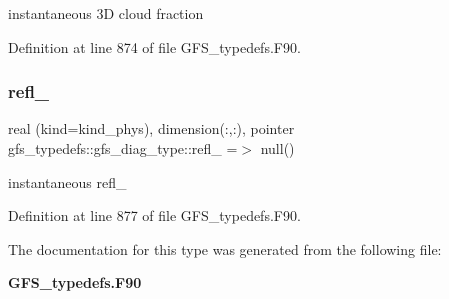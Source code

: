 instantaneous 3D cloud fraction 



Definition at line 874 of file G\+F\+S\+\_\+typedefs.\+F90.

\mbox{\label{structgfs__typedefs_1_1gfs__diag__type_aa85bbfebf8a815ea2e12ea060f6ea8a9}} 
\subsubsection{refl\+\_\+10cm}
{\footnotesize\ttfamily real (kind=kind\+\_\+phys), dimension(\+:,\+:), pointer gfs\+\_\+typedefs\+::gfs\+\_\+diag\+\_\+type\+::refl\+\_\+10cm =$>$ null()}



instantaneous refl\+\_\+10cm 



Definition at line 877 of file G\+F\+S\+\_\+typedefs.\+F90.



The documentation for this type was generated from the following file\+:\begin{DoxyCompactItemize}
\item 
\textbf{ G\+F\+S\+\_\+typedefs.\+F90}\end{DoxyCompactItemize}

